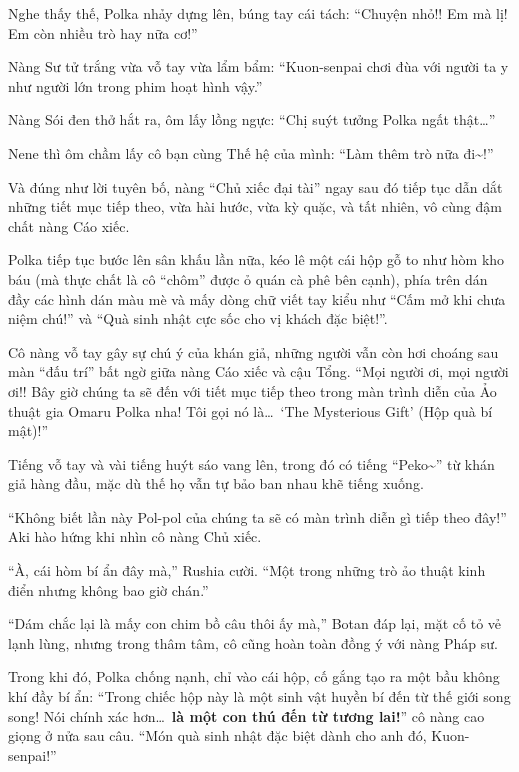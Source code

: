 \documentclass[../main.tex]{subfiles}
\begin{document}
Nghe thấy thế, Polka nhảy dựng lên, búng tay cái tách: ``Chuyện nhỏ!! Em mà lị! Em còn nhiều trò hay nữa cơ!''

Nàng Sư tử trắng vừa vỗ tay vừa lẩm bẩm: ``Kuon-senpai chơi đùa với người ta y như người lớn trong phim hoạt hình vậy.''

Nàng Sói đen thở hắt ra, ôm lấy lồng ngực: ``Chị suýt tưởng Polka ngất thật\dots''

Nene thì ôm chầm lấy cô bạn cùng Thế hệ của mình: ``Làm thêm trò nữa đi\~{}!''

Và đúng như lời tuyên bố, nàng ``Chủ xiếc đại tài'' ngay sau đó tiếp tục dẫn dắt những tiết mục tiếp theo, vừa hài hước, vừa kỳ quặc, và tất nhiên, vô cùng đậm chất nàng Cáo xiếc.

\ct

Polka tiếp tục bước lên sân khấu lần nữa, kéo lê một cái hộp gỗ to như hòm kho báu (mà thực chất là cô ``chôm'' được ỏ quán cà phê bên cạnh), phía trên dán đầy các hình dán màu mè và mấy dòng chữ viết tay kiểu như ``Cấm mở khi chưa niệm chú!'' và ``Quà sinh nhật cực sốc cho vị khách đặc biệt!''.

Cô nàng vỗ tay gây sự chú ý của khán giả, những người vẫn còn hơi choáng sau màn ``đấu trí'' bất ngờ giữa nàng Cáo xiếc và cậu Tổng. ``Mọi người ơi, mọi người ơi!! Bây giờ chúng ta sẽ đến với tiết mục tiếp theo trong màn trình diễn của Ảo thuật gia Omaru Polka nha! Tôi gọi nó là\dots\ `The Mysterious Gift' (Hộp quà bí mật)!''

Tiếng vỗ tay và vài tiếng huýt sáo vang lên, trong đó có tiếng ``Peko\~{}'' từ khán giả hàng đầu, mặc dù thế họ vẫn tự bảo ban nhau khẽ tiếng xuống.

``Không biết lần này Pol-pol của chúng ta sẽ có màn trình diễn gì tiếp theo đây!'' Aki hào hứng khi nhìn cô nàng Chủ xiếc.

``À, cái hòm bí ẩn đây mà,'' Rushia cười. ``Một trong những trò ảo thuật kinh điển nhưng không bao giờ chán.''

``Dám chắc lại là mấy con chim bồ câu thôi ấy mà,'' Botan đáp lại, mặt cố tỏ vẻ lạnh lùng, nhưng trong thâm tâm, cô cũng hoàn toàn đồng ý với nàng Pháp sư.

Trong khi đó, Polka chống nạnh, chỉ vào cái hộp, cố gắng tạo ra một bầu không khí đầy bí ẩn: ``Trong chiếc hộp này là một sinh vật huyền bí đến từ thế giới song song! Nói chính xác hơn\dots\ \textbf{là một con thú đến từ tương lai!}'' cô nàng cao giọng ở nửa sau câu. ``Món quà sinh nhật đặc biệt dành cho anh đó, Kuon-senpai!''
\end{document}

